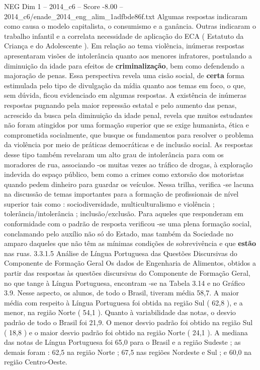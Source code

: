 \begin{textsample}{NEG Dim 1 – 2014\_c6 – Score -8.00 – 2014\_c6/enade\_2014\_eng\_alim\_1adfbde86f.txt}
Algumas respostas indicaram como causa o modelo capitalista, o consumismo e a ganância.
Outras indicaram o trabalho infantil e a correlata necessidade de aplicação do ECA ( Estatuto da Criança e do Adolescente ).
Em relação ao tema violência, inúmeras respostas apresentaram visões de intolerância quanto aos menores infratores, postulando a diminuição da idade para efeitos de \textbf{criminalização}, bem como defendendo a majoração de penas.
Essa perspectiva revela uma cisão social, de \textbf{certa} forma estimulada pelo tipo de divulgação da mídia quanto aos temas em foco, o que, sem dúvida, ficou evidenciado em algumas respostas.
A existência de inúmeras respostas pugnando pela maior repressão estatal e pelo aumento das penas, acrescido da busca pela diminuição da idade penal, revela que muitos estudantes não foram atingidos por uma formação superior que se exige humanista, ética e comprometida socialmente, que busque os fundamentos para resolver o problema da violência por meio de práticas democráticas e de inclusão social.
As respostas desse tipo também revelaram um alto grau de intolerância para com os moradores de rua, associando -os muitas vezes ao tráfico de drogas, à exploração indevida do espaço público, bem como a crimes como extorsão dos motoristas quando pedem dinheiro para guardar os veículos.
Nessa trilha, verifica -se lacuna na discussão de temas importantes para a formação de profissionais de nível superior tais como : sociodiversidade, multiculturalismo e violência ; tolerância/intolerância ; inclusão/exclusão.
Para aqueles que responderam em conformidade com o padrão de resposta verificou -se uma plena formação social, conclamando pelo auxílio não só do Estado, mas também da Sociedade no amparo daqueles que não têm as mínimas condições de sobrevivência e que \textbf{estão} nas ruas. 3.3.1.5 Análise de Língua Portuguesa das Questões Discursivas do Componente de Formação Geral Os dados de Engenharia de Alimentos, obtidos a partir das respostas às questões discursivas do Componente de Formação Geral, no que tange à Língua Portuguesa, encontram -se na Tabela 3.14 e no Gráfico 3.9.
Nesse aspecto, os alunos, de todo o Brasil, tiveram média 58,7.
A maior média com respeito à Língua Portuguesa foi obtida na região Sul ( 62,8 ), e a menor, na região Norte ( 54,1 ).
Quanto à variabilidade das notas, o desvio padrão de todo o Brasil foi 21,9.
O menor desvio padrão foi obtido na região Sul ( 18,8 ) e o maior desvio padrão foi obtido na região Norte ( 24,1 ).
A mediana das notas de Língua Portuguesa foi 65,0 para o Brasil e a região Sudeste ; as demais foram : 62,5 na região Norte ; 67,5 nas regiões Nordeste e Sul ; e 60,0 na região Centro-Oeste.

\end{textsample}
